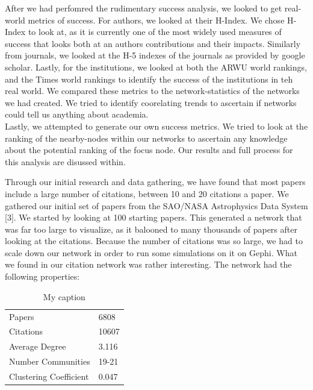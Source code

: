 \documentclass[times, 10pt,twocolumn]{article}
\begin{document}
After we had perfomred the rudimentary success analysis, we looked to get real-world metrics of success. For authors, we looked at their H-Index. We chose H-Index to look at, as it is currently one of the most widely used measures of success that looks both at an authors contributions and their impacts. Similarly from journals, we looked at the H-5 indexes of the journals as provided by google scholar. Lastly, for the institutions, we looked at both the ARWU world rankings, and the Times world rankings to identify the success of the institutions in teh real world. We compared these metrics to the network-statistics of the networks we had created. We tried to identify coorelating trends to ascertain if networks could tell us anything about academia. \\

Lastly, we attempted to generate our own success metrics. We tried to look at the ranking of the nearby-nodes within our networks to ascertain any knowledge about the potential ranking of the focus node. Our results and full process for this analysis are disussed within.

Through our initial research and data gathering, we have found that most papers include a large number of citations, between 10 and 20 citations a paper. We gathered our initial set of papers from the SAO/NASA Astrophysics Data System [3]. We started by looking at 100  starting papers. This generated a network that was far too large to visualize, as it balooned to many thousands of papers after looking at the citations. Because the number of citations was so large, we had to scale down our network in order to run some simulations on it on Gephi. What we found in our citation network was rather interesting. The network had the following properties:
\begin{table}[]
\centering
\caption{My caption}
\label{my-label}
\begin{tabular}{ll}
Papers                 & 6808  \\
Citations              & 10607 \\
Average Degree         & 3.116 \\
Number Communities     & 19-21 \\
Clustering Coefficient & 0.047
\end{tabular}
\end{table}
\end{document}
